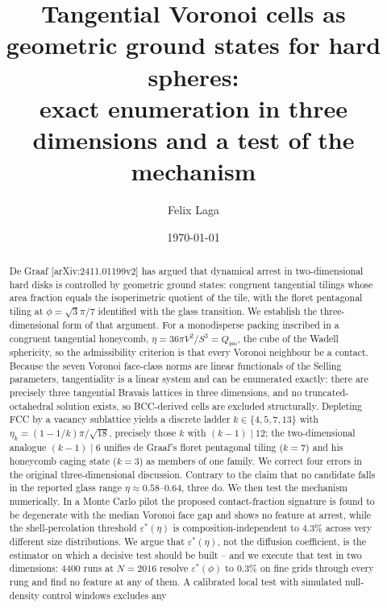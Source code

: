 \documentclass[aps,prl,twocolumn,superscriptaddress,floatfix]{revtex4-2}
\begin{document}
\title{Tangential Voronoi cells as geometric ground states for hard spheres:\\
exact enumeration in three dimensions and a test of the mechanism}

\author{Felix Laga}

\date{\today}

\begin{abstract}
De Graaf [arXiv:2411.01199v2] has argued that dynamical arrest in two-dimensional
hard disks is controlled by geometric ground states: congruent tangential
tilings whose area fraction equals the isoperimetric quotient of the tile, with
the floret pentagonal tiling at $\phi=\sqrt{3}\pi/7$ identified with the glass
transition. We establish the three-dimensional form of that argument. For a
monodisperse packing inscribed in a congruent tangential honeycomb,
$\eta = 36\pi V^2/S^3 = Q_{\mathrm{iso}}$, the cube of the Wadell sphericity, so
the admissibility criterion is that every Voronoi neighbour be a contact. Because
the seven Voronoi face-class norms are linear functionals of the Selling
parameters, tangentiality is a linear system and can be enumerated exactly: there
are precisely three tangential Bravais lattices in three dimensions, and no
truncated-octahedral solution exists, so BCC-derived cells are excluded
structurally. Depleting FCC by a vacancy sublattice yields a discrete ladder
$k\in\{4,5,7,13\}$ with $\eta_k=(1-1/k)\pi/\sqrt{18}$, precisely those $k$ with
$(k-1)\mid 12$; the two-dimensional analogue $(k-1)\mid 6$ unifies de Graaf's
floret pentagonal tiling ($k=7$) and his honeycomb caging state ($k=3$) as
members of one family. We correct four errors in the original
three-dimensional discussion. Contrary to the claim that no candidate falls in
the reported glass range $\eta\approx0.58$--$0.64$, three do. We then test the
mechanism numerically. In a Monte Carlo pilot the proposed contact-fraction
signature is found to be degenerate with the median Voronoi face gap and shows no
feature at arrest, while the shell-percolation threshold $\varepsilon^*(\eta)$ is
composition-independent to $4.3\%$ across very different size distributions. We
argue that $\varepsilon^*(\eta)$, not the diffusion coefficient, is the estimator
on which a decisive test should be built -- and we execute that test in two
dimensions: $4400$ runs at $N=2016$ resolve $\varepsilon^*(\phi)$ to $0.3\%$ on
fine grids through every rung and find no feature at any of them. A calibrated
local test with simulated null-density control windows excludes any

\end{abstract}
\end{document}
